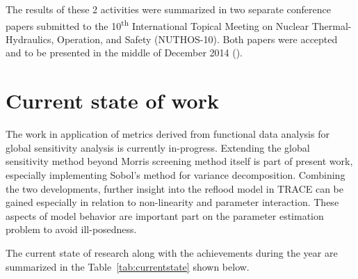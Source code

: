\documentclass[11pt,titlepage]{article}
\begin{document}
\begin{table}[t]
\begin{minipage}[b]{.50\textwidth}
\label{fig:fpc_regfd}


\end{minipage}
\end{table}


The results of these 2 activities were summarized in two separate conference 
papers submitted to the 10\textsuperscript{th} International Topical Meeting on 
Nuclear Thermal-Hydraulics, Operation, and Safety (NUTHOS-10). 
Both papers were accepted and to be presented in the middle of December 2014 
(\cite{Wicaksono2014d,Wicaksono2014e}).

\section{Current state of work}

The work in application of metrics derived from functional data analysis for global 
sensitivity analysis is currently in-progress.
Extending the global sensitivity method beyond Morris screening method itself is 
part of present work, especially implementing Sobol's method for variance 
decomposition.
Combining the two developments, further insight into the reflood model in 
TRACE can be gained especially in relation to non-linearity and parameter 
interaction.
These aspects of model behavior are important part on the parameter estimation 
problem to avoid ill-posedness.

The current state of research along with the achievements during the year are
summarized in the Table~\ref{tab:currentstate} shown below.
\end{document}
